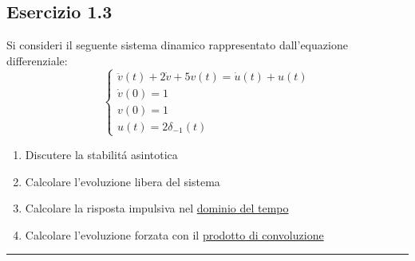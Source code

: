 \documentclass[12pt,a4paper]{article}
\begin{document}
	\subsection*{Esercizio 1.3}
	Si consideri il seguente sistema dinamico rappresentato dall'equazione differenziale:
	\[
		\begin{cases}
			\ddot{v}(t) + 2\dot{v} + 5v(t) = \dot{u}(t) + u(t)\\
			\dot{v}(0) = 1\\
			v(0) = 1\\
			u(t) = 2\delta_{-1}(t)
		\end{cases}
	\]
	\begin{enumerate}
		\item Discutere la stabilit\'a asintotica
		\item Calcolare l'evoluzione libera del sistema
		\item Calcolare la risposta impulsiva nel \underline{dominio del tempo}
		\item Calcolare l'evoluzione forzata con il \underline{prodotto di convoluzione}
	\end{enumerate}
	\par\noindent\rule{\textwidth}{0.4pt}
\end{document}

